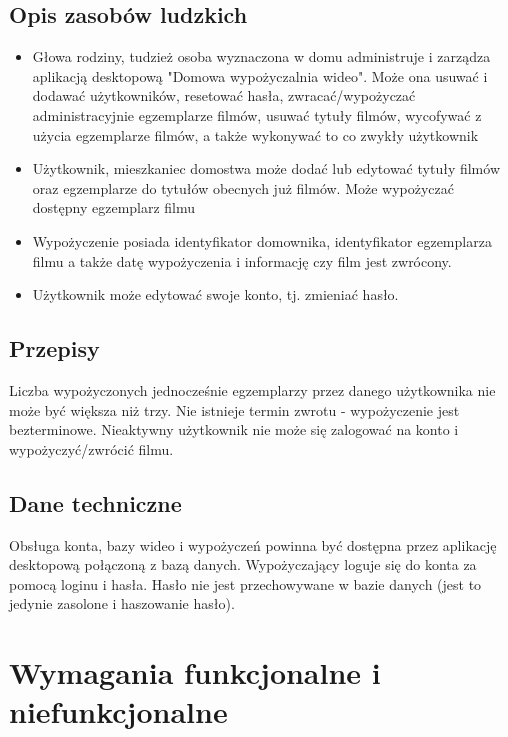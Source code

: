 \documentclass{article}
\begin{document}
	\subsection{Opis zasobów ludzkich}
	\begin{itemize}
		\item Głowa rodziny, tudzież osoba wyznaczona w domu administruje i zarządza aplikacją desktopową "Domowa wypożyczalnia wideo". Może ona usuwać i dodawać użytkowników, resetować hasła, zwracać/wypożyczać administracyjnie egzemplarze filmów, usuwać tytuły filmów, wycofywać z użycia egzemplarze filmów, a także wykonywać to co zwykły użytkownik
		\item Użytkownik, mieszkaniec domostwa może dodać lub edytować tytuły filmów oraz egzemplarze do tytułów obecnych już filmów. Może wypożyczać dostępny egzemplarz filmu
		\item Wypożyczenie posiada identyfikator domownika, identyfikator egzemplarza filmu a także datę wypożyczenia i informację czy film jest zwrócony.
		\item Użytkownik może edytować swoje konto, tj. zmieniać hasło.	
	\end{itemize}
	\subsection{Przepisy}
		Liczba wypożyczonych jednocześnie egzemplarzy przez danego użytkownika nie może być większa niż trzy. Nie istnieje termin zwrotu - wypożyczenie jest bezterminowe. Nieaktywny użytkownik nie może się zalogować na konto i wypożyczyć/zwrócić filmu.
	\subsection{Dane techniczne}
	\label{dane_techniczne}
		 Obsługa konta, bazy wideo i wypożyczeń powinna być dostępna przez aplikację desktopową połączoną z bazą danych.
		Wypożyczający loguje się do konta za pomocą loginu i hasła. Hasło nie jest przechowywane w bazie danych (jest to jedynie zasolone i haszowanie hasło).
	\newpage
	\section{Wymagania funkcjonalne i niefunkcjonalne}
\end{document}
